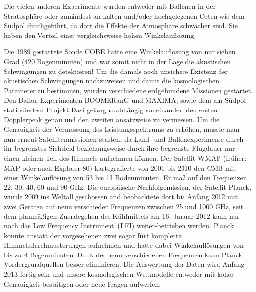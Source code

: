 \documentclass[10pt,a4paper]{article}
\begin{document}
Die vielen anderen Experimente wurden entweder mit Ballonen in der Stratosphäre oder zumindest an kalten und/oder hochgelegenen Orten wie dem Südpol durchgeführt, da dort die Effekte der Atmosphäre schwächer sind. Sie haben den Vorteil einer vergleichsweise hohen Winkelauflösung.

Die 1989 gestartete Sonde COBE hatte eine Winkelauflösung von nur sieben Grad (420 Bogenminuten) und war somit nicht in der Lage die akustischen Schwingungen zu detektieren!\cite{S+W00} Um die damals noch unsichere Existenz der akustischen Schwingungen nachzuweisen und damit die kosmologischen Parameter zu bestimmen, wurden verschiedene erdgebundene Missionen gestartet. Den Ballon-Experimenten BOOMERanG und MAXIMA, sowie dem am Südpol stationiertem Projekt Dasi gelang unabhängig voneinander, den ersten Dopplerpeak genau und den zweiten ansatzweise zu vermessen.\cite{S+W03} Um die Genauigkeit der Vermessung des Leistungsspektrums zu erhöhen, musste man nun erneut Satellitenmissionen starten, da Land- und Ballonexperimente durch ihr begrenztes Sichtfeld beziehungsweise durch ihre begrenzte Flugdauer nur einen kleinen Teil des Himmels aufnehmen können.
Der Satellit WMAP (früher: MAP oder auch Explorer 80) kartografierte von 2001 bis 2010 den CMB mit einer Winkelauflösung von 53 bis 13 Bodenminuten.\cite{PJ1} Er maß auf den Frequenzen 22, 30, 40, 60 und 90 GHz.
Die europäische Nachfolgemission, der Satellit Planck, wurde 2009 ins Weltall geschossen und beobachtete dort bis Anfang 2012 mit zwei Geräten auf neun verschieden Frequenzen zwischen 25 und 1000 GHz, seit dem planmäßigen Zuendegehen des Kühlmittels am 16. Januar 2012 kann nur noch das \glqq Low Frequency Instrument\grqq\  (LFI) weiter-betrieben werden\cite{PJ1}\cite{pm}.
Planck konnte anstatt der vorgesehenen zwei sogar fünf komplette Himmelsdurchmusterungen aufnehmen und hatte dabei Winkelauflösungen von bis zu 4 Bogenminuten. %
Dank der neun verschiedenen Frequenzen kann Planck Vordergrundquellen besser eliminieren. Die Auswertung der Daten wird Anfang 2013 fertig sein und unsere kosmologischen Weltmodelle entweder mit hoher Genauigkeit bestätigen oder neue Fragen aufwerfen.

\newpage
{}

\end{document}

